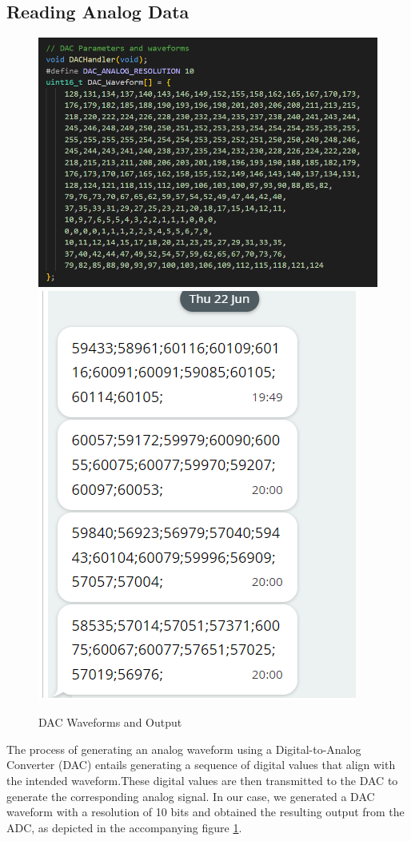 \subsection{Reading Analog Data} 
 
\begin{figure}[htbp]
\centering
\includegraphics[scale=0.5]{images/DACWaveform.png}\includegraphics[scale=0.6]{images/SamplesCLOUD.png}
\caption{DAC Waveforms and Output}
\label{fig:x DAC_Waveforms}
\end{figure}
The process of generating an analog waveform using a Digital-to-Analog Converter (DAC) entails generating a sequence of digital values that align with the intended waveform.These digital values are then transmitted to the DAC to generate the corresponding analog signal. In our case, we generated a DAC waveform with a resolution of 10 bits and obtained the resulting output from the ADC, as depicted in the accompanying figure \ref{fig:x DAC_Waveforms}.
